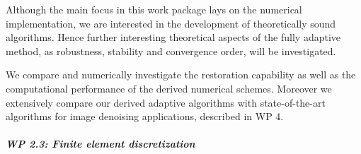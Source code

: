 \documentclass[enabledeprecatedfontcommands,cleardoublepage=empty,headsepline,twoside,11pt,DIV=15,BCOR=12mm,final]{scrartcl}
\begin{document}
 Although the main focus in this work package lays on the numerical implementation, we are interested in the development of theoretically sound algorithms. Hence further interesting theoretical aspects of the fully adaptive method, as robustness, stability and convergence order, will be investigated.
 
 We compare and numerically investigate the restoration capability as well as the computational performance of the derived numerical schemes. Moreover
 we extensively compare our derived adaptive algorithms with state-of-the-art algorithms for image denoising applications, described in WP 4.
 
 
 
 \subparagraph{WP 2.3: Finite element discretization}
 
\end{document}
